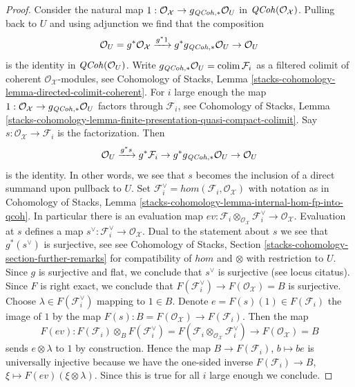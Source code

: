 \begin{proof}
Consider the natural map
$1 : \mathcal{O}_\mathcal{X} \to g_{\mathit{QCoh}, *}\mathcal{O}_U$
in $\mathit{QCoh}(\mathcal{O}_\mathcal{X})$. Pulling back to $U$ and
using adjunction we find that the composition
$$
\mathcal{O}_U =
g^*\mathcal{O}_\mathcal{X} \xrightarrow{g^*1}
g^*g_{\mathit{QCoh}, *}\mathcal{O}_U \to \mathcal{O}_U
$$
is the identity in $\mathit{QCoh}(\mathcal{O}_U)$.
Write $g_{\mathit{QCoh}, *}\mathcal{O}_U = \mathop{\mathrm{colim}}\nolimits \mathcal{F}_i$
as a filtered colimit of coherent $\mathcal{O}_\mathcal{X}$-modules, see
Cohomology of Stacks, Lemma
\ref{stacks-cohomology-lemma-directed-colimit-coherent}.
For $i$ large enough the map
$1 : \mathcal{O}_\mathcal{X} \to g_{\mathit{QCoh}, *}\mathcal{O}_U$
factors through $\mathcal{F}_i$, see
Cohomology of Stacks, Lemma
\ref{stacks-cohomology-lemma-finite-presentation-quasi-compact-colimit}.
Say $s : \mathcal{O}_\mathcal{X} \to \mathcal{F}_i$ is the
factorization. Then
$$
\mathcal{O}_U \xrightarrow{g^*s} g^*\mathcal{F}_i \to
g^*g_{\mathit{QCoh}, *}\mathcal{O}_U \to \mathcal{O}_U
$$
is the identity. In other words, we see that $s$ becomes the
inclusion of a direct summand upon pullback to $U$. Set
$\mathcal{F}_i^\vee = hom(\mathcal{F}_i, \mathcal{O}_\mathcal{X})$
with notation as in
Cohomology of Stacks, Lemma
\ref{stacks-cohomology-lemma-internal-hom-fp-into-qcoh}.
In particular there is an evaluation map
$ev : \mathcal{F}_i \otimes_{\mathcal{O}_\mathcal{X}} \mathcal{F}_i^\vee
\to \mathcal{O}_\mathcal{X}$.
Evaluation at $s$ defines a map
$s^\vee : \mathcal{F}_i^\vee \to \mathcal{O}_\mathcal{X}$.
Dual to the statement about $s$ we see that $g^*(s^\vee)$ is surjective, see
see Cohomology of Stacks, Section
\ref{stacks-cohomology-section-further-remarks}
for compatibility of $hom$ and $\otimes$ with restriction to $U$.
Since $g$ is surjective and flat, we conclude that $s^\vee$ is surjective
(see locus citatus). Since $F$ is right exact, we conclude that
$F(\mathcal{F}_i^\vee) \to F(\mathcal{O}_\mathcal{X}) = B$ is surjective.
Choose $\lambda \in F(\mathcal{F}_i^\vee)$
mapping to $1 \in B$. Denote $e = F(s)(1) \in F(\mathcal{F}_i)$
the image of $1$ by the map
$F(s) : B = F(\mathcal{O}_\mathcal{X}) \to F(\mathcal{F}_i)$.
Then the map
$$
F(ev) :
F(\mathcal{F}_i) \otimes_B F(\mathcal{F}_i^\vee) =
F(\mathcal{F}_i \otimes_{\mathcal{O}_\mathcal{X}} \mathcal{F}_i^\vee)
\longrightarrow
F(\mathcal{O}_\mathcal{X}) = B
$$
sends $e \otimes \lambda$ to $1$ by construction. Hence the
map $B \to F(\mathcal{F}_i)$, $b \mapsto be$
is universally injective because we have the one-sided
inverse $F(\mathcal{F}_i) \to B$, $\xi \mapsto F(ev)(\xi \otimes \lambda)$.
Since this is true for all $i$ large enough we conclude.
\end{proof}

